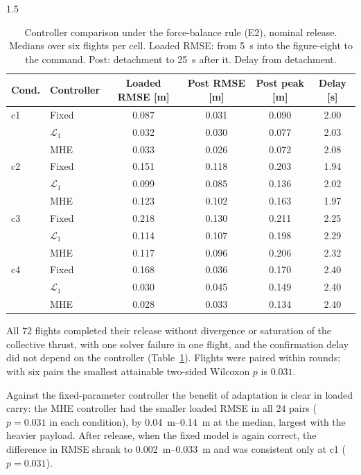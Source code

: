 \begin{spacing}{1.5}
\begin{table}[ht]
\centering
\caption[Controller comparison under the force-balance rule (E2)]{Controller
comparison under the force-balance rule (E2), nominal release. Medians over six
flights per cell. Loaded RMSE: from \SI{5}{\second} into the figure-eight to the
command. Post: detachment to \SI{25}{\second} after it. Delay from detachment.}
\label{tab:camp-ctrl}
\small
\begin{tabular}{@{}l l c c c c@{}}
\toprule
\textbf{Cond.} & \textbf{Controller} & \textbf{Loaded RMSE [m]} &
\textbf{Post RMSE [m]} & \textbf{Post peak [m]} & \textbf{Delay [s]} \\
\midrule
c1 & Fixed & 0.087 & 0.031 & 0.090 & 2.00 \\
   & $\mathcal{L}_1$ & 0.032 & 0.030 & 0.077 & 2.03 \\
   & MHE   & 0.033 & 0.026 & 0.072 & 2.08 \\
\midrule
c2 & Fixed & 0.151 & 0.118 & 0.203 & 1.94 \\
   & $\mathcal{L}_1$ & 0.099 & 0.085 & 0.136 & 2.02 \\
   & MHE   & 0.123 & 0.102 & 0.163 & 1.97 \\
\midrule
c3 & Fixed & 0.218 & 0.130 & 0.211 & 2.25 \\
   & $\mathcal{L}_1$ & 0.114 & 0.107 & 0.198 & 2.29 \\
   & MHE   & 0.117 & 0.096 & 0.206 & 2.32 \\
\midrule
c4 & Fixed & 0.168 & 0.036 & 0.170 & 2.40 \\
   & $\mathcal{L}_1$ & 0.030 & 0.045 & 0.149 & 2.40 \\
   & MHE   & 0.028 & 0.033 & 0.134 & 2.40 \\
\bottomrule
\end{tabular}
\end{table}

All $72$ flights completed their release without divergence or saturation of
the collective thrust, with one solver failure in one flight, and the
confirmation delay did not depend
on the controller (Table~\ref{tab:camp-ctrl}). Flights were paired within
rounds; with six pairs the smallest attainable two-sided Wilcoxon $p$ is
$0.031$.

Against the fixed-parameter controller the benefit of adaptation is clear in
loaded carry: the MHE controller had the smaller loaded RMSE in all $24$ pairs
($p=0.031$ in each condition), by \SIrange{0.04}{0.14}{\meter} at the median,
largest with the heavier payload. After release, when the fixed model is again
correct, the difference in RMSE shrank to \SIrange{0.002}{0.033}{\meter} and
was consistent only at c1 ($p=0.031$).


\end{spacing}
